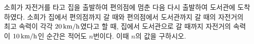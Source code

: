 소희가 자전거를 타고 집을 출발하여 편의점에 멈춘 다음 다시 출발하여 도서관에 도착하였다. 소희가 집에서 편의점까지 갈 때와 편의점에서 도서관까지 갈 때의 자전거의 최고 속력이 각각 $20\mkern3mu \mathrm{km/h}$였다고 할 때, 집에서 도서관으로 갈 때까지 자전거의 속력이 $10\mkern3mu \mathrm{km/h}$인 순간은 적어도 $n$번이다. 이때 $n$의 값을 구하시오.
